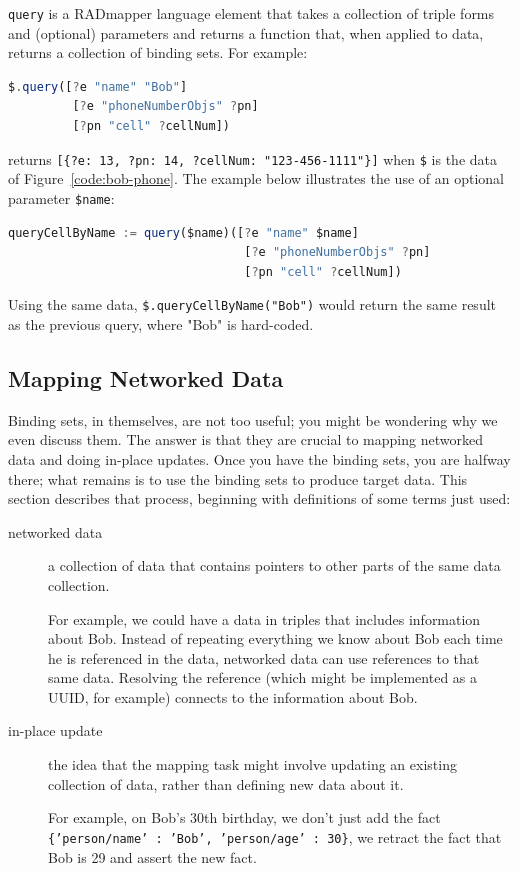 \documentclass[9pt,letterpaper]{article}
\newcommand{\stt}[1]{\texttt{#1}}
\begin{document}
\stt{query} is a RADmapper language element that takes a collection of triple forms and (optional) parameters and returns a function that, when applied to data, returns a collection of binding sets.
For example:

\begin{lstlisting}[language=JavaScript]
 $.query([?e "name" "Bob"]
         [?e "phoneNumberObjs" ?pn]
         [?pn "cell" ?cellNum])
\end{lstlisting}

returns \stt{[\{?e: 13, ?pn: 14, ?cellNum: "123-456-1111"\}]} when \stt{\$} is the data of Figure~\ref{code:bob-phone}.
The example below illustrates the use of an optional parameter \stt{\$name}:

\begin{lstlisting}[language=JavaScript]
 queryCellByName := query($name)([?e "name" $name]
                                 [?e "phoneNumberObjs" ?pn]
                                 [?pn "cell" ?cellNum])
\end{lstlisting}

Using the same data, \stt{\$.queryCellByName("Bob")} would return the same result as the previous query, where "Bob" is hard-coded.

\subsection{Mapping  Networked Data}

Binding sets, in themselves, are not too useful; you might be wondering why we even discuss them.
The answer is that they are crucial to mapping networked data and doing in-place updates.
Once you have the binding sets, you are halfway there; what remains is to use the binding sets to produce target data.
This section describes that process, beginning with definitions of some terms just used:

\begin{description}
\item[networked data] a collection of data that contains pointers to other parts of the same data collection.

  For example, we could have a data in triples that includes information about Bob.
  Instead of repeating everything we know about Bob each time he is referenced in the data,
  networked data can use references to that same data.
  Resolving the reference (which might be implemented as a UUID, for example) connects to the information about Bob.
\item[in-place update] the idea that the mapping task might involve updating an existing collection of data, rather than
  defining new data about it.

  For example, on Bob's 30th birthday, we don't just add the fact \stt{\{'person/name' : 'Bob', 'person/age' : 30\}}, we
  retract the fact that Bob is 29 and assert the new fact.
\end{description}
\end{document}
